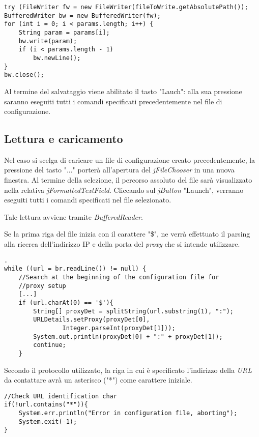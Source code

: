\vspace{0.5cm}
\begin{lstlisting}
try (FileWriter fw = new FileWriter(fileToWrite.getAbsolutePath()); 
BufferedWriter bw = new BufferedWriter(fw);
for (int i = 0; i < params.length; i++) {
	String param = params[i];
	bw.write(param);
	if (i < params.length - 1)
		bw.newLine();
} 
bw.close();     
\end{lstlisting}

Al termine del salvataggio viene abilitato il tasto "Lauch": alla sua pressione saranno eseguiti tutti i comandi specificati precedentemente nel file di configurazione.

\subsection{Lettura e caricamento}
Nel caso si scelga di caricare un file di configurazione creato precedentemente, la pressione del tasto "..." porter\`{a} all'apertura del \textit{jFileChooser} in una nuova finestra.
Al termine della selezione, il percorso assoluto del file sar\`{a} visualizzato nella relativa \textit{jFormattedTextField}. 
Cliccando sul \textit{jButton} "Launch", verranno eseguiti tutti i comandi specificati nel file selezionato.

Tale lettura avviene tramite \textit{BufferedReader}.

Se la prima riga del file inizia con il carattere "\$", ne verr\`{a} effettuato il parsing alla ricerca dell'indirizzo IP e della porta del \textit{proxy} che si intende utilizzare. 

\begin{lstlisting}.
while ((url = br.readLine()) != null) {
	//Search at the beginning of the configuration file for 
	//proxy setup
	[...]
	if (url.charAt(0) == '$'){
		String[] proxyDet = splitString(url.substring(1), ":");
		URLDetails.setProxy(proxyDet[0], 
				Integer.parseInt(proxyDet[1]));
		System.out.println(proxyDet[0] + ":" + proxyDet[1]);
		continue;
	}
\end{lstlisting}

Secondo il protocollo utilizzato, la riga in cui \`{e} specificato l'indirizzo della \textit{URL} da contattare avr\`{a} un asterisco ("*") come carattere iniziale.

\begin{lstlisting}
//Check URL identification char
if(!url.contains("*")){
	System.err.println("Error in configuration file, aborting");
	System.exit(-1);
}
\end{lstlisting}


